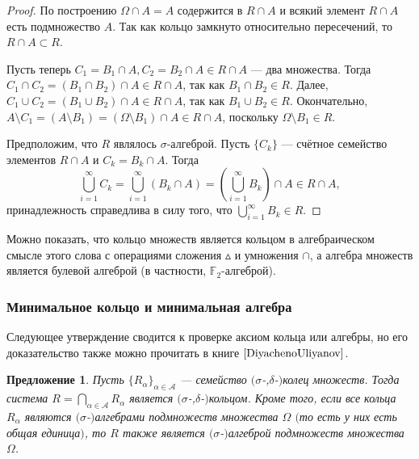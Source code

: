 \documentclass[12pt]{article}
\newtheorem{proposition}[theorem]{Предложение}
\numberwithin{theorem}{section}
\theoremstyle{definition}
\newcommand{\FF}{\mathbb{F}}
\begin{document}
	\begin{proof}
		По построению $ \Omega \cap A = A $ содержится в $ R \cap A $
		и всякий элемент $ R \cap A $ есть подмножество $ A $.
		Так как кольцо замкнуто относительно пересечений, то $ R \cap A \subset R $.
		
		Пусть теперь $ C_1 = B_1 \cap A, C_2 = B_2 \cap A \in R \cap A $ --- два множества.
		Тогда $ C_1 \cap C_2 = (B_1 \cap B_2)  \cap A \in R \cap A $, так как $ B_1 \cap B_2 \in R $.
		Далее, $ C_1 \cup C_2 = (B_1 \cup B_2) \cap A \in R \cap A $, так как $ B_1 \cup B_2 \in R $.
		Окончательно, $ A \setminus C_1 = (A \setminus B_1) = (\Omega \setminus B_1) \cap A \in R \cap A $,
		поскольку $ \Omega \setminus B_1 \in R $.
		
		Предположим, что $ R $ являлось $ \sigma $-алгеброй. Пусть $ \{C_k\} $ --- счётное семейство 
		элементов $ R \cap A $ и $ C_k = B_k \cap A $.
		Тогда
		$$ \bigcup\limits_{i = 1}^{\infty} C_k = \bigcup\limits_{i = 1}^{\infty} (B_k \cap A) 
		= \left(\bigcup\limits_{i = 1}^{\infty} B_k \right) \cap A \in R \cap A, $$
		принадлежность справедлива в силу того, что $ \bigcup\limits_{i = 1}^{\infty} B_k \in R $.
	\end{proof}
	
	Можно показать, 
	что кольцо множеств является кольцом в алгебраическом смысле этого слова с операциями сложения $ \vartriangle $
	и умножения $ \cap $, а алгебра множеств является булевой алгеброй (в частности, $ \FF_2 $-алгеброй).
	
	
	\subsubsection{Минимальное кольцо и минимальная алгебра}
	
	Следующее утверждение сводится к проверке аксиом кольца или алгебры,
	но его доказательство также можно прочитать в книге $ \cite{DiyachenoUliyanov} $.
	
	\begin{proposition} \label{intersection of rings}
		Пусть $ \{R_{\alpha}\}_{\alpha \in \mathcal{A}} $ --- семейство $ ( $$ \sigma $-,$ \delta $-$ ) $колец множеств.
		Тогда  система $ R = \bigcap\limits_{\alpha \in \mathcal{A}} R_{\alpha} $ является $ ( $$ \sigma $-,$ \delta $-$ ) $кольцом.
		Кроме того, если все кольца $ R_{\alpha} $ являются $ ( $$ \sigma $-$ ) $алгебрами подмножеств множества $ \Omega $
		$ ( $то есть у них есть общая единица$ ) $, то $ R $ также является $ ( $$ \sigma $-$ ) $алгеброй подмножеств множества $ \Omega $.
	\end{proposition}
	
\end{document}
